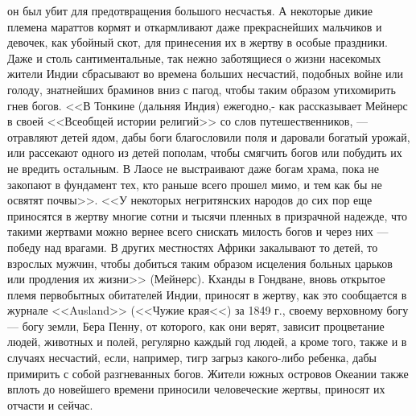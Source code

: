 \documentclass[12pt]{article}
\begin{document}
он был убит для предотвращения большого несчастья. А некоторые дикие племена мараттов кормят и откармливают даже прекраснейших мальчиков и девочек, как убойный скот, для принесения их в жертву в особые праздники. Даже и столь сантиментальные, так нежно заботящиеся о жизни насекомых жители Индии сбрасывают во времена больших несчастий, подобных войне или голоду, знатнейших браминов вниз с пагод, чтобы таким образом утихомирить гнев богов. <<В Тонкине (дальняя Индия) ежегодно,- как рассказывает Мейнерс в своей <<Всеобщей истории религий>> со слов путешественников, --- отравляют детей ядом, дабы боги благословили поля и даровали богатый урожай, или рассекают одного из детей пополам, чтобы смягчить богов или побудить их не вредить остальным. В Лаосе не выстраивают даже богам храма, пока не закопают в фундамент тех, кто раньше всего прошел мимо, и тем как бы не освятят почвы>>. <<У некоторых негритянских народов до сих пор еще приносятся в жертву многие сотни и тысячи пленных в призрачной надежде, что такими жертвами можно вернее всего снискать милость богов и через них --- победу над врагами. В других местностях Африки закалывают то детей, то взрослых мужчин, чтобы добиться таким образом исцеления больных царьков или продления их жизни>> (Мейнерс). Кханды в Гондване, вновь открытое племя первобытных обитателей Индии, приносят в жертву, как это сообщается в журнале <<Ausland>> (<<Чужие края<<) за 1849 г., своему верховному богу --- богу земли, Бера Пенну, от которого, как они верят, зависит процветание людей, животных и полей, регулярно каждый год людей, а кроме того, также и в случаях несчастий, если, например, тигр загрыз какого-либо ребенка, дабы примирить с собой разгневанных богов. Жители южных островов Океании также вплоть до новейшего времени приносили человеческие жертвы, приносят их отчасти и сейчас. 
\end{document}
